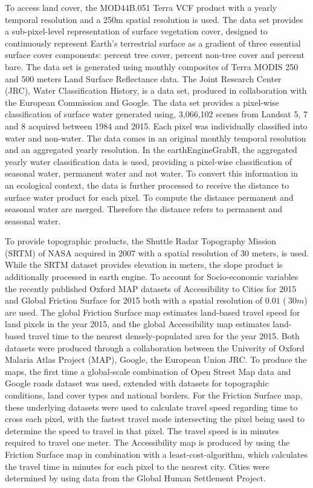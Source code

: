 To access land cover, the MOD44B.051 Terra VCF product with a yearly temporal resolution and a 250m spatial resolution is used. The data set provides a sub-pixel-level representation of surface vegetation cover, designed to continuously represent Earth's terrestrial surface as a gradient of three essential surface cover components: percent tree cover, percent non-tree cover and percent bare. The data set is generated using monthly composites of Terra MODIS 250 and 500 meters Land Surface Reflectance data.
The Joint Research Center (JRC), Water Classification History, is a data set, produced in collaboration with the European Commission and Google. The data set provides a pixel-wise classification of surface water generated using, 3,066,102 scenes from Landsat 5, 7 and 8 acquired between 1984 and 2015. Each pixel was individually classified into water and non-water. The data comes in an original monthly temporal resolution and an aggregated yearly resolution. In the earthEngineGrabR, the aggregated yearly water classification data is used, providing a pixel-wise classification of seasonal water, permanent water and not water. To convert this information in an ecological context, the data is further processed to receive the distance to surface water product for each pixel. To compute the distance permanent and seasonal water are merged. Therefore the distance refers to permanent and seasonal water.

To provide topographic products, the Shuttle Radar Topography Mission (SRTM) of NASA acquired in 2007 with a spatial resolution of 30 meters, is used. While the SRTM dataset provides elevation in meters, the slope product is additionally processed in earth engine. To account for Socio-economic variables the recently published Oxford MAP datasets of Accessibility to Cities for 2015 and Global Friction Surface for 2015 both with a spatial resolution of $0.01$ ($~ 30m$) are used. The global Friction Surface map estimates land-based travel speed for land pixels in the year 2015, and the global Accessibility map estimates land-based travel time to the nearest densely-populated area for the year 2015. Both datasets were produced through a collaboration between the Univerity of Oxford Malaria Atlas Project (MAP), Google, the European Union JRC. To produce the maps, the first time a global-scale combination of Open Street Map data and Google roads dataset was used, extended with datasets for topographic conditions, land cover types and national borders.
For the Friction Surface map, these underlying datasets were used to calculate travel speed regarding time to cross each pixel, with the fastest travel mode intersecting the pixel being used to determine the speed to travel in that pixel. The travel speed is in minutes required to travel one meter. The Accessibility map is produced by using the Friction Surface map in combination with a least-cost-algorithm, which calculates the travel time in minutes for each pixel to the nearest city. Cities were determined by using data from the Global Human Settlement Project.  

